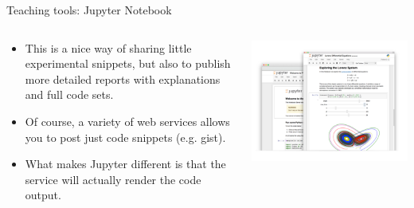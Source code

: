 \documentclass[11pt]{beamer}
\begin{document}
\begin{frame}{Teaching tools: Jupyter Notebook}
\begin{columns}[T] %
\begin{column}{.48\textwidth}
		\begin{itemize}
\item This is a nice way of sharing little experimental snippets, but also to publish more detailed reports with explanations and full code sets.  
\item Of course, a variety of web services allows you to post just code snippets (e.g. gist). 
\item What makes Jupyter different is that the service will actually render the code output.
		\end{itemize}
\end{column}%
\hfill%
\begin{column}{.48\textwidth}
		\includegraphics[width=\linewidth]{../05-pictures/lesson-1-1_pic_27.PNG}
\end{column}%
\end{columns}
\end{frame}
\end{document}
